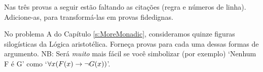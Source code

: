 \problempart 
\label{pr.justifyFOLproof}
Nas tr\^es provas a seguir est\~ao faltando as cita\c c\~oes (regra e
n\'umeros de linha). Adicione-as, para transform\'a-las em provas fidedignas.
\begin{earg}
\item \begin{fitchproof}
	\open
	\close
{} {}
\end{fitchproof}

\item \begin{fitchproof}
 {}
 {}
\end{fitchproof}

\item \begin{fitchproof}
\open
\close
{}
\end{fitchproof}
\end{earg}
 
\problempart
\label{pr.BarbaraEtc.proof1}
No problema A do Capítulo  \ref{s:MoreMonadic}, consideramos quinze figuras silog\'isticas da L\'ogica aristot\'elica. Forne\c ca provas para cada uma dessas formas de argumento. NB: Ser\'a \emph{muito} mais f\'acil se voc\^e simbolizar (por exemplo) `Nenhum F \'e G' como `$\forall x (\mathord{F}(x) \rightarrow \neg \mathord{G}(x))$'.

